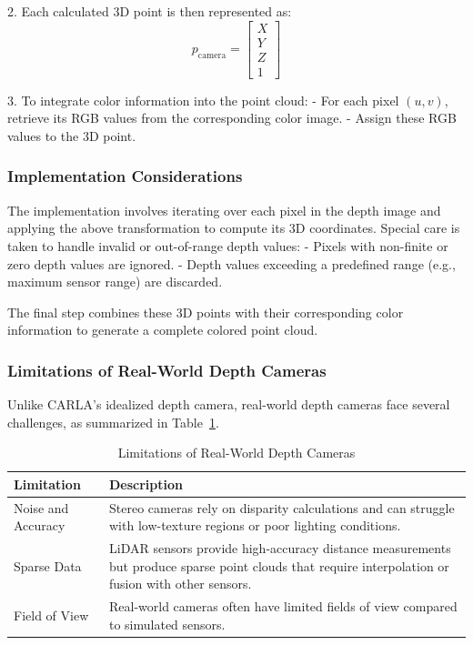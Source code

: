 2. Each calculated 3D point is then represented as:
   \[
   p_{\text{camera}} = \begin{bmatrix} X \\ Y \\ Z \\ 1 \end{bmatrix}
   \]

3. To integrate color information into the point cloud:
   - For each pixel \((u, v)\), retrieve its RGB values from the corresponding color image.
   - Assign these RGB values to the 3D point.

\subsubsection{Implementation Considerations}

The implementation involves iterating over each pixel in the depth image and applying the above transformation to compute its 3D coordinates. Special care is taken to handle invalid or out-of-range depth values:
- Pixels with non-finite or zero depth values are ignored.
- Depth values exceeding a predefined range (e.g., maximum sensor range) are discarded.

The final step combines these 3D points with their corresponding color information to generate a complete colored point cloud.

\subsubsection{Limitations of Real-World Depth Cameras}

Unlike CARLA's idealized depth camera, real-world depth cameras face several challenges, as summarized in Table~\ref{table:depth_camera_limitations}.

\begin{table}[h!]
\centering
\begin{tabular}{@{}p{4cm}p{10cm}@{}}
\toprule
\textbf{Limitation} & \textbf{Description} \\
\midrule
Noise and Accuracy & Stereo cameras rely on disparity calculations and can struggle with low-texture regions or poor lighting conditions. \\
\midrule
Sparse Data & LiDAR sensors provide high-accuracy distance measurements but produce sparse point clouds that require interpolation or fusion with other sensors. \\
\midrule
Field of View & Real-world cameras often have limited fields of view compared to simulated sensors. \\
\bottomrule
\end{tabular}
\caption{Limitations of Real-World Depth Cameras}
\label{table:depth_camera_limitations}
\end{table}

